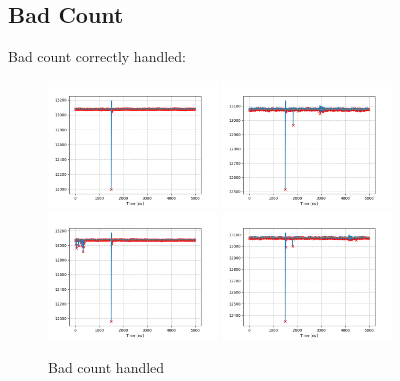 \documentclass[a4paper,twoside,openany]{book}
\begin{document}
		\subsection{Bad Count}
Bad count correctly handled:
\begin{figure}[H]
\centering
\includegraphics[width=0.4\textwidth, height=0.3\textwidth]{Bad}
\includegraphics[width=0.4\textwidth, height=0.3\textwidth]{Bad2}
\includegraphics[width=0.4\textwidth, height=0.3\textwidth]{Bad3}
\includegraphics[width=0.4\textwidth, height=0.3\textwidth]{Bad4}
\caption{Bad count handled}
\end{figure}
\end{document}
